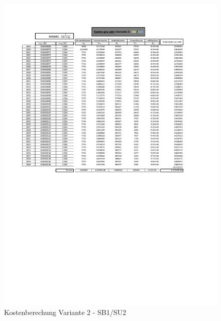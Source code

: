 \begin{figure}[h!]
	\centering
	\includegraphics[width=\textwidth]{figures/Anhang/f-00-A-V2-B1-U2}
	\caption{Kostenberechung Variante 2 - SB1/SU2}
\end{figure}

